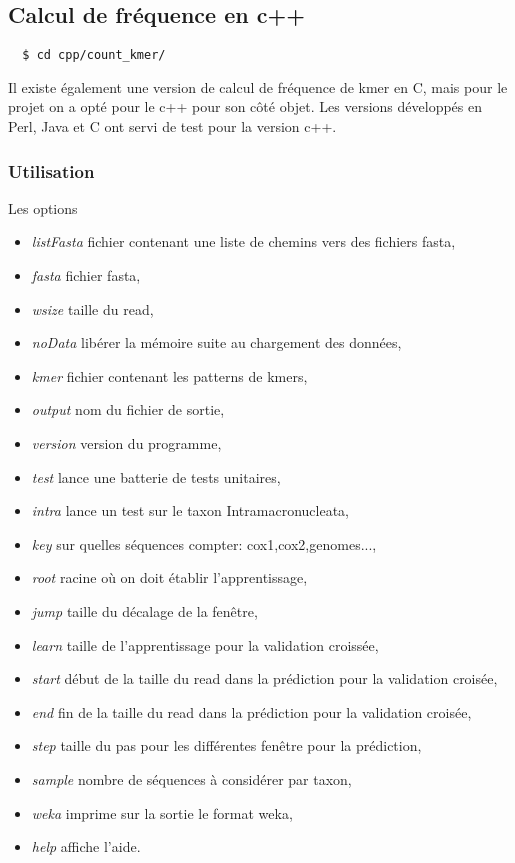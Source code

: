 \subsection{Calcul de fréquence en c++}
\label{cpp}

  \begin{verbatim}
  $ cd cpp/count_kmer/
\end{verbatim}
Il existe également une version de calcul de fréquence de kmer en C, mais pour
le projet on a opté pour le c++ pour son côté objet. Les versions développés en Perl, Java et C
ont servi de test pour la version c++.

\subsubsection{Utilisation}
Les options
\begin{itemize}
  \item \textit{listFasta}           fichier contenant une liste de chemins vers des fichiers fasta,
		\item \textit{fasta }              fichier fasta,
		\item\textit{wsize}               taille du read,
		\item \textit{noData}              libérer la mémoire suite au chargement des données,
		\item \textit{kmer}                fichier contenant les patterns de kmers,
		\item \textit{output}              nom du fichier de sortie,
		\item \textit{version}             version du programme,
		\item \textit{test}                lance une batterie de tests unitaires,
		\item \textit{intra}               lance un test sur le taxon Intramacronucleata,
		\item \textit{key}                 sur quelles séquences compter: cox1,cox2,genomes...,
		\item \textit{root}                racine où on doit établir l’apprentissage,
		\item \textit{jump}                taille du décalage de la fenêtre,
		\item \textit{learn}               taille de l'apprentissage pour la validation croissée,
		\item \textit{start}               début de la taille du read dans la prédiction pour la validation croisée,
		\item \textit{end}                 fin de la taille du read dans la prédiction pour la validation croisée,
		\item \textit{step}                taille du pas pour les différentes fenêtre pour la prédiction,
		\item \textit{sample}              nombre de séquences à considérer par taxon,
		\item \textit{weka}                imprime sur la sortie le format weka,
		\item \textit{help}                affiche l'aide.
\end{itemize}
